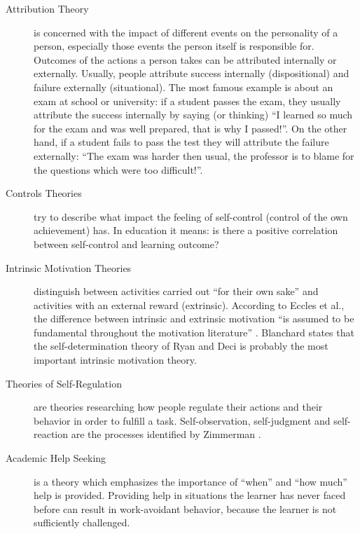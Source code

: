 \begin{description}
\item[Attribution Theory] is concerned with the impact
of different events on the personality of a person, especially those events the
person itself is responsible for. Outcomes of the actions a person takes can be
attributed internally or externally. Usually, people attribute success
internally (dispositional) and failure externally (situational). The most
famous example is about an exam at school or university: if a student
passes the exam, they usually attribute the success internally by
saying (or thinking) ``I learned so much for the exam
and was well prepared, that is why I passed!''. On the other hand, if a
student fails to pass the test they will attribute the failure externally: ``The
exam was harder then usual, the professor is to blame for the questions which were too difficult!''.
\item[Controls Theories] try to describe what impact the feeling of
self-control (control of the own achievement) has. In education it means: is
there  a positive correlation between self-control and learning outcome?
\item[Intrinsic Motivation Theories] distinguish between activities carried
out ``for their own sake'' \cite{Blanchard2004b} and activities with an
external reward (extrinsic). According to Eccles et al., the difference between
intrinsic and extrinsic motivation ``is assumed to be fundamental throughout
the motivation literature'' \cite{Blanchard2004b}. Blanchard states that the
self-determination theory of Ryan and Deci \cite{Ryan2000a} is probably the
most important intrinsic motivation theory.
\item[Theories of Self-Regulation] are theories researching how people
regulate their actions and their behavior in order to fulfill a task.
Self-observation, self-judgment and self-reaction are the processes identified
by Zimmerman \cite{Zimmerman1989a}.
\item[Academic Help Seeking] is a theory which emphasizes the importance of
``when'' and ``how much'' help is provided. Providing help in situations the
learner has never faced before can result in work-avoidant behavior, because
the learner is not sufficiently challenged.
\end{description}

